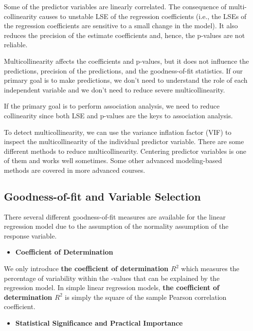 \documentclass[
]{book}
\providecommand{\tightlist}{%
  \setlength{\itemsep}{0pt}\setlength{\parskip}{0pt}}
\begin{document}
Some of the predictor variables are linearly correlated. The consequence of multi-collinearity causes to unstable LSE of the regression coefficients (i.e., the LSEs of the regression coefficients are sensitive to a small change in the model). It also reduces the precision of the estimate coefficients and, hence, the p-values are not reliable.

Multicollinearity affects the coefficients and p-values, but it does not influence the predictions, precision of the predictions, and the goodness-of-fit statistics. If our primary goal is to make predictions, we don't need to understand the role of each independent variable and we don't need to reduce severe multicollinearity.

If the primary goal is to perform association analysis, we need to reduce collinearity since both LSE and p-values are the keys to association analysis.

To detect multicollinearity, we can use the variance inflation factor (VIF) to inspect the multicollinearity of the individual predictor variable. There are some different methods to reduce multicollinearity. Centering predictor variables is one of them and works well sometimes. Some other advanced modeling-based methods are covered in more advanced courses.

\hypertarget{goodness-of-fit-and-variable-selection}{%
\subsection{Goodness-of-fit and Variable Selection}\label{goodness-of-fit-and-variable-selection}}

There several different goodness-of-fit measures are available for the linear regression model due to the assumption of the normality assumption of the response variable.

\begin{itemize}
\tightlist
\item
  \textbf{Coefficient of Determination}
\end{itemize}

We only introduce \textbf{the coefficient of determination \(R^2\)} which measures the percentage of variability within the -values that can be explained by the regression model. In simple linear regression models, \textbf{the coefficient of determination \(R^2\)} is simply the square of the sample Pearson correlation coefficient.

\begin{itemize}
\tightlist
\item
  \textbf{Statistical Significance and Practical Importance}
\end{itemize}
\end{document}
